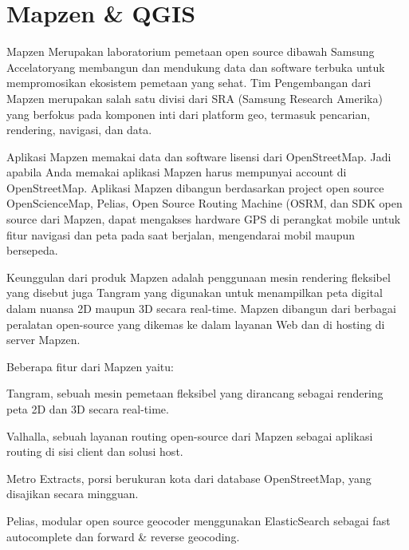 \section{Mapzen & QGIS}
Mapzen Merupakan laboratorium pemetaan open source dibawah Samsung Accelatoryang membangun dan mendukung data dan software terbuka untuk mempromosikan ekosistem pemetaan yang sehat. Tim Pengembangan dari Mapzen merupakan salah satu divisi dari SRA (Samsung Research Amerika) yang berfokus pada komponen inti dari platform geo, termasuk pencarian, rendering, navigasi, dan data.

Aplikasi Mapzen memakai data dan software lisensi dari OpenStreetMap. Jadi apabila Anda memakai aplikasi Mapzen harus mempunyai account di OpenStreetMap. Aplikasi Mapzen dibangun berdasarkan project open source OpenScienceMap, Pelias, Open Source Routing Machine (OSRM, dan SDK open source dari Mapzen, dapat mengakses hardware GPS di perangkat mobile untuk fitur navigasi dan peta pada saat berjalan, mengendarai mobil maupun bersepeda.

Keunggulan dari produk Mapzen adalah penggunaan mesin rendering fleksibel yang disebut juga Tangram yang digunakan untuk menampilkan peta digital dalam nuansa 2D maupun 3D secara real-time. Mapzen dibangun dari berbagai peralatan open-source yang dikemas ke dalam layanan Web dan di hosting di server Mapzen.

Beberapa fitur  dari Mapzen yaitu:
\item Tangram, sebuah mesin pemetaan fleksibel yang dirancang sebagai rendering peta 2D dan 3D secara real-time.
\item Valhalla, sebuah layanan routing open-source dari Mapzen sebagai aplikasi routing di sisi client dan solusi host.
\item Metro Extracts, porsi berukuran kota dari database OpenStreetMap, yang disajikan secara mingguan.
\item Pelias, modular open source geocoder menggunakan ElasticSearch sebagai fast autocomplete dan forward & reverse geocoding.


